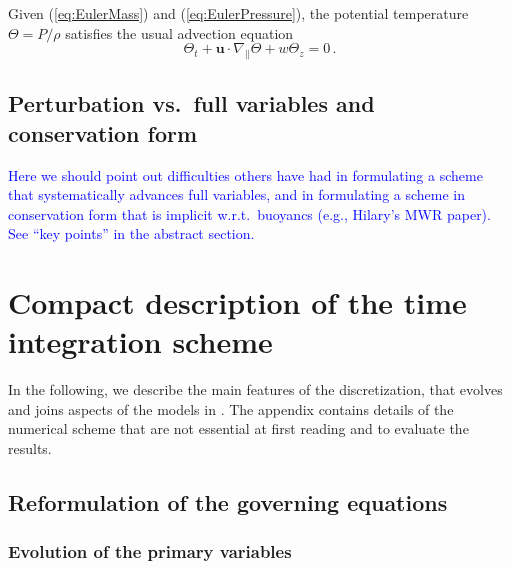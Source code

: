 \documentclass{ametsoc}
\theoremstyle{definition}
\newcommand{\klein}[1]{\textcolor{blue}{#1}}
\newcommand{\eq}[1]{(\ref{#1})}
\newcommand{\vect}[1]{{\mathbf{#1}}}
\newcommand{\vu}{\vect{u}}
\begin{document}
Given \eq{eq:EulerMass} and \eq{eq:EulerPressure}, the potential temperature
$\Theta = P/\rho$ satisfies the usual advection equation
%
\begin{equation}
\Theta_t + \vu\cdot\nabla_\parallel \Theta + w \Theta_z = 0\,.
\end{equation}


\subsection{Perturbation vs.\ full variables and conservation form}
\label{ssec:PertFullCons}

\klein{Here we should point out difficulties others have had in formulating
a scheme that systematically advances full variables, and in formulating
a scheme in conservation form that is implicit w.r.t.\ buoyancs (e.g.,
Hilary's MWR paper). See ``key points'' in the abstract section.}


\section{Compact description of the time integration scheme}
\label{sec:TimeDiscretizationSummary}

In the following, we describe the main features of the discretization, that evolves and joins aspects of the models in \cite{KleinTCFD2009}
\cite{BenacchioEtAl2014}. The appendix contains details of the numerical scheme that are not essential at first reading and to evaluate the results.


\subsection{Reformulation of the governing equations}
\label{ssec:Reformulation}


\subsubsection{Evolution of the primary variables}
\label{sssec:PrimaryVariables}
\end{document}

